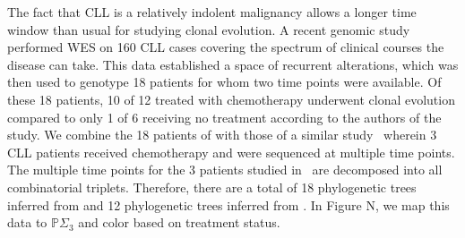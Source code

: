 \documentclass[a4paper,11pt]{article}
\begin{document}
The fact that CLL is a relatively indolent malignancy allows a longer time window than usual for studying clonal evolution.
A recent genomic study~\cite{landau2013evolution} performed WES on 160 CLL cases covering the spectrum of clinical courses the disease can take.
This data established a space of recurrent alterations, which was then used to genotype 18 patients for whom two time points were available.
Of these 18 patients, 10 of 12 treated with chemotherapy underwent clonal evolution compared to only 1 of 6 receiving no treatment according to the authors of the study.
We combine the 18 patients of \cite{landau2013evolution} with those of a similar study~\cite{schuh2012monitoring} wherein 3 CLL patients received chemotherapy and were sequenced at multiple time points.
The multiple time points for the 3 patients studied in~\cite{schuh2012monitoring} are decomposed into all combinatorial triplets.
Therefore, there are a total of 18 phylogenetic trees inferred from \cite{landau2013evolution} and 12 phylogenetic trees inferred from \cite{schuh2012monitoring}.
In Figure N, we map this data to $\mathbb{P}\Sigma_3$ and color based on treatment status.
\end{document}
